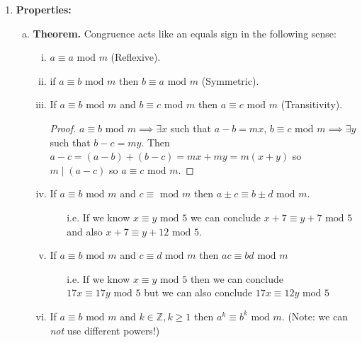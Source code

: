 \documentclass[class=article, crop=false]{standalone}
\def\integers{{\mathbb Z}}
\begin{document}
\begin{enumerate}[1.]
	\item \textbf{Properties:}
	\begin{enumerate}[(a)]
		\item \textbf{Theorem.} Congruence acts like an equals sign in the following sense:
		\begin{enumerate}[(i)]
			\item $a\equiv a\mbox{ mod }m$ (Reflexive).
			\item if $a\equiv b\mbox{ mod }m$ then $b\equiv a\mbox{ mod }m$ (Symmetric).
			\item If $a\equiv b\mbox{ mod }m$ and $b\equiv c\mbox{ mod }m$ then $a\equiv c\mbox{ mod }m$ (Transitivity).
				\begin{proof}
					$a\equiv b\mbox{ mod }m \implies \exists x$ such that $a-b=mx$,
					$b\equiv c\mbox{ mod }m \implies \exists y$ such that $b-c=my$. Then 
					$a-c = (a-b)+(b-c) =mx+my = m(x+y)$ so $m\mid (a-c)$ so $a\equiv c\mbox{ mod }m$.
				\end{proof}
			\item If $a\equiv b\mbox{ mod }m$ and $c\equiv \mbox{ mod }m$ then $a\pm c \equiv b\pm d \mbox{ mod }m$.
				\begin{itemize}
					\item[i.e.] If we know $x\equiv y\mbox{ mod } 5$ we can conclude $x+7\equiv y+7\mbox{ mod }5$ and also
						$x+7 \equiv y+12 \mbox{ mod }5$.  
				\end{itemize}
			\item If $a\equiv b\mbox{ mod }m$ and $c\equiv d\mbox{ mod }m$ then $ac\equiv bd\mbox{ mod }m$
				\begin{itemize}
					\item[i.e.] If we know $x\equiv y\mbox{ mod }5$ then we can conclude $17x\equiv 17y\mbox{ mod }5$
						but we can also conclude $17x\equiv 12y\mbox{ mod }5$  
				\end{itemize}
			\item If $a\equiv b\mbox{ mod }m$ and $k\in\integers, k\geq 1$ then $a^k \equiv b^k \mbox{ mod }m$.
				(Note: we can \emph{not} use different powers!)
		\end{enumerate}


\end{enumerate}
\end{enumerate}
\end{document}
